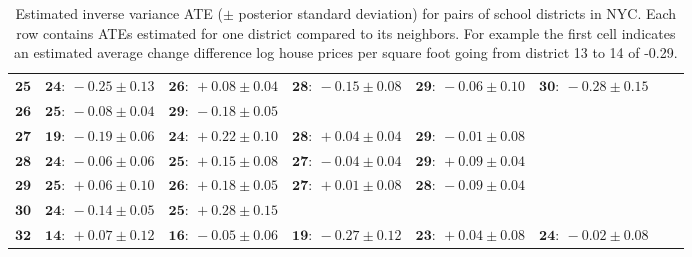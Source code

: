 \documentclass[letter]{article}
\begin{document}
\begin{landscape}
\begin{table}[!h]
\begin{tabular}{r|lllllll}
\( \mathbf{25} \)& \( \mathbf{24:}~-0.25 \pm 0.13 \)& \( \mathbf{26:}~+0.08 \pm 0.04 \)& \( \mathbf{28:}~-0.15 \pm 0.08 \)& \( \mathbf{29:}~-0.06 \pm 0.10 \)& \( \mathbf{30:}~-0.28 \pm 0.15 \)\\ 
\( \mathbf{26} \)& \( \mathbf{25:}~-0.08 \pm 0.04 \)& \( \mathbf{29:}~-0.18 \pm 0.05 \)\\ 
\( \mathbf{27} \)& \( \mathbf{19:}~-0.19 \pm 0.06 \)& \( \mathbf{24:}~+0.22 \pm 0.10 \)& \( \mathbf{28:}~+0.04 \pm 0.04 \)& \( \mathbf{29:}~-0.01 \pm 0.08 \)\\ 
\( \mathbf{28} \)& \( \mathbf{24:}~-0.06 \pm 0.06 \)& \( \mathbf{25:}~+0.15 \pm 0.08 \)& \( \mathbf{27:}~-0.04 \pm 0.04 \)& \( \mathbf{29:}~+0.09 \pm 0.04 \)\\ 
\( \mathbf{29} \)& \( \mathbf{25:}~+0.06 \pm 0.10 \)& \( \mathbf{26:}~+0.18 \pm 0.05 \)& \( \mathbf{27:}~+0.01 \pm 0.08 \)& \( \mathbf{28:}~-0.09 \pm 0.04 \)\\ 
\( \mathbf{30} \)& \( \mathbf{24:}~-0.14 \pm 0.05 \)& \( \mathbf{25:}~+0.28 \pm 0.15 \)\\ 
\( \mathbf{32} \)& \( \mathbf{14:}~+0.07 \pm 0.12 \)& \( \mathbf{16:}~-0.05 \pm 0.06 \)& \( \mathbf{19:}~-0.27 \pm 0.12 \)& \( \mathbf{23:}~+0.04 \pm 0.08 \)& \( \mathbf{24:}~-0.02 \pm 0.08 \)
\end{tabular}
\caption{
Estimated inverse variance ATE ($\pm$ posterior standard deviation) for pairs of school districts in NYC.
Each row contains ATEs estimated for one district compared to its neighbors.
For example the first cell indicates an estimated average change difference log house prices per square foot going from district 13 to 14 of -0.29.
}
\label{table:NYC_pairwise}
\end{table}\end{landscape}
\restoregeometry

    
    
	
	

    
    
\end{document}
